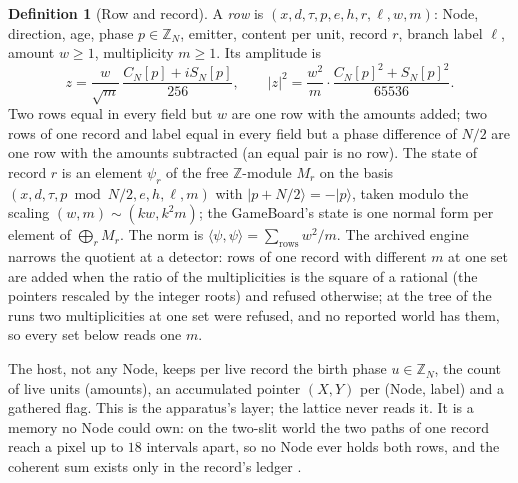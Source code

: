 \documentclass[11pt]{article}
\theoremstyle{definition}
\newtheorem{definition}{Definition}
\newcommand{\Z}{\mathbb{Z}}
\begin{document}
\begin{definition}[Row and record]\label{def:row}
A \emph{row} is $(x, d, \tau, p, e, h, r, \ell, w, m)$: Node, direction,
age, phase $p \in \Z_N$, emitter, content per unit, record $r$, branch
label $\ell$, amount $w \ge 1$, multiplicity $m \ge 1$. Its amplitude is
\begin{equation}
z = \frac{w}{\sqrt m}\,\frac{C_N[p] + i S_N[p]}{256}, \qquad |z|^2 = \frac{w^2}{m}\cdot\frac{C_N[p]^2 + S_N[p]^2}{65536}.
\end{equation}
Two rows equal in every field but $w$ are one row with the amounts added;
two rows of one record and label equal in every field but a phase
difference of $N/2$ are one row with the amounts subtracted (an equal pair
is no row). The state of record $r$ is an element $\psi_r$ of the free
$\Z$-module $M_r$ on the basis $(x, d, \tau, p \bmod N/2, e, h, \ell, m)$
with $|p + N/2\rangle = -|p\rangle$, taken modulo the scaling
$(w, m) \sim (kw, k^2 m)$; the GameBoard's state is one normal form per
element of $\bigoplus_r M_r$. The norm is $\langle\psi,\psi\rangle =
\sum_{\text{rows}} w^2/m$. The archived engine narrows the quotient at a
detector: rows of one record with different $m$ at one set are added when
the ratio of the multiplicities is the square of a rational (the pointers
rescaled by the integer roots) and refused otherwise; at the tree of the
runs two multiplicities at one set were refused, and no reported world
has them, so every set below reads one $m$.
\end{definition}

The host, not any Node, keeps per live record the birth phase $u \in \Z_N$,
the count of live units (amounts), an accumulated pointer $(X, Y)$ per
(Node, label) and a gathered flag. This is the apparatus's layer; the
lattice never reads it. It is a memory no Node could own: on the two-slit
world the two paths of one record reach a pixel up to $18$ intervals
apart, so no Node ever holds both rows, and the coherent sum exists only
in the record's ledger \cite{log}.
\end{document}
